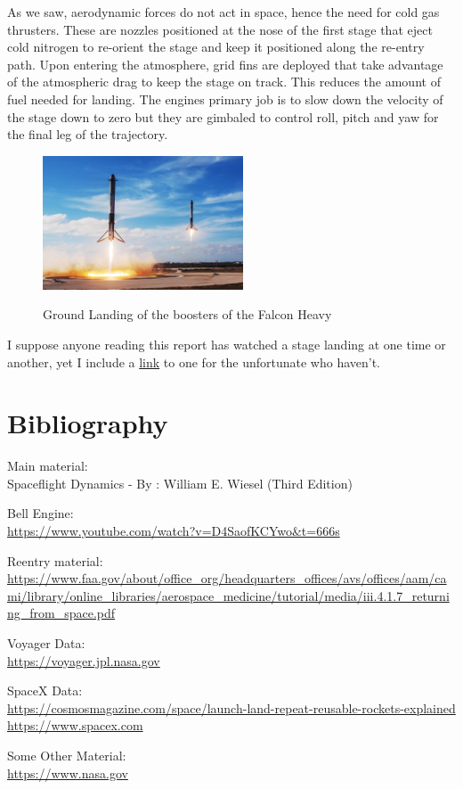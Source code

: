 \documentclass[12pt, letterpaper]{article}
\begin{document}
As we saw, aerodynamic forces do not act in space, hence the need for cold gas thrusters. These are nozzles positioned at the nose of the first stage that eject cold nitrogen to re-orient the stage and keep it positioned along the re-entry path. Upon entering the atmosphere, grid fins are deployed that take advantage of the atmospheric drag to keep the stage on track. This reduces the amount of fuel needed for landing. The engines primary job is to slow down the velocity of the stage down to zero but they are gimbaled to control roll, pitch and yaw for the final leg of the trajectory.

\begin{figure}[H]
	\centering
    \includegraphics[height=150px]{spacexrocketreturn}
    \label{fig:spacexrocketreturn}
    \caption{Ground Landing of the boosters of the Falcon Heavy}
\end{figure}

I suppose anyone reading this report has watched a stage landing at one time or another, yet I include a \href{https://www.youtube.com/watch?v=sf4qRY3h_eo}{link} to one for the unfortunate who haven't. 

\newpage

\section{Bibliography}

Main material:\\
Spaceflight Dynamics - By : William E. Wiesel (Third Edition)\\
\vspace{1px}

Bell Engine:\\
\url{https://www.youtube.com/watch?v=D4SaofKCYwo&t=666s}\\
\vspace{1px}

Reentry material:\\
\url{https://www.faa.gov/about/office_org/headquarters_offices/avs/offices/aam/cami/library/online_libraries/aerospace_medicine/tutorial/media/iii.4.1.7_returning_from_space.pdf}\\
\vspace{1px}

Voyager Data:\\
\url{https://voyager.jpl.nasa.gov}\\
\vspace{1px}

SpaceX Data:\\
\url{https://cosmosmagazine.com/space/launch-land-repeat-reusable-rockets-explained}
\url{https://www.spacex.com}\\
\vspace{1px}

Some Other Material:\\
\url{https://www.nasa.gov}
\end{document}
